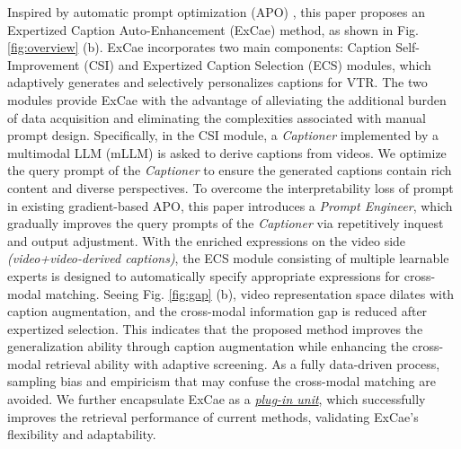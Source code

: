 Inspired by automatic prompt optimization (APO) \cite{pryzant2023automatic,yang2023dynamic}, this paper proposes an Expertized Caption Auto-Enhancement (ExCae) method, as shown in Fig. \ref{fig:overview} (b).
ExCae incorporates two main components: Caption Self-Improvement (CSI) and Expertized Caption Selection (ECS) modules, which adaptively generates and selectively personalizes captions for VTR. The two modules provide ExCae with the advantage of alleviating the additional burden of data acquisition and eliminating the complexities associated with manual prompt design.
Specifically, in the CSI module, a \textit{Captioner} implemented by a multimodal LLM (mLLM) is asked to derive captions from videos. We optimize the query prompt of the \textit{Captioner} to ensure the generated captions contain rich content and diverse perspectives. To overcome the interpretability loss of prompt in existing gradient-based APO, this paper introduces a \textit{Prompt Engineer}, which gradually improves the query prompts of the \textit{Captioner} via repetitively inquest and output adjustment.
With the enriched expressions on the video side \textit{(video+video-derived captions)}, the ECS module consisting of multiple learnable experts is designed to automatically specify appropriate expressions for cross-modal matching. 
Seeing Fig. \ref{fig:gap} (b), video representation space dilates with caption augmentation, and the cross-modal information gap is reduced after expertized selection. This indicates that the proposed method improves the generalization ability through caption augmentation while enhancing the cross-modal retrieval ability with adaptive screening. As a fully data-driven process, sampling bias and empiricism that may confuse the cross-modal matching are avoided. We further encapsulate ExCae as a \underline{\textit{plug-in unit}}, which successfully improves the retrieval performance of current methods, validating ExCae's flexibility and adaptability.

